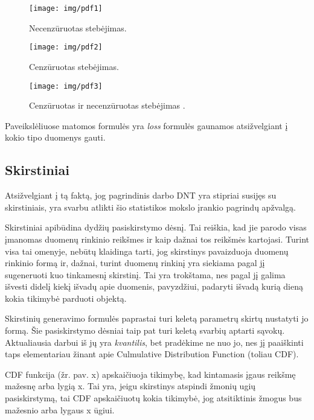 \documentclass{VUMIFPSkursinis}
\begin{document}
\begin{figure}[H]
  \centering
  \texttt{[image: img/pdf1]}
  \caption{ Necenzūruotas stebėjimas\cite{WTTEBLOG}.}
  \label{img:pdf1}
\end{figure}


\begin{figure}[H]
  \centering
  \texttt{[image: img/pdf2]}
  \caption{ Cenzūruotas stebėjimas\cite{WTTEBLOG}.}
  \label{img:pdf2}
\end{figure}


\begin{figure}[H]
  \centering
  \texttt{[image: img/pdf3]}
  \caption{ Cenzūruotas ir necenzūruotas stebėjimas \cite{WTTEBLOG}.}
  \label{img:pdf3}
\end{figure}

Paveikslėliuose matomos formulės yra \textit{loss} formulės gaunamos atsižvelgiant į kokio tipo duomenys gauti. 



\subsection{Skirstiniai}

Atsižvelgiant į tą faktą, jog pagrindinis darbo DNT yra stipriai susijęs su skirstiniais, yra svarbu atlikti šio statistikos mokslo įrankio pagrindų apžvalgą. 

Skirstiniai apibūdina dydžių pasiskirstymo dėsnį. Tai reiškia, kad jie parodo visas įmanomas duomenų rinkinio reikšmes ir kaip dažnai tos reikšmės kartojasi. Turint visa tai omenyje, nebūtų klaidinga tarti, jog skirstinys pavaizduoja duomenų rinkinio formą ir, dažnai, turint duomenų rinkinį yra siekiama pagal jį sugeneruoti kuo tinkamesnį skirstinį. Tai yra trokštama, nes pagal jį galima išvesti didelį kiekį išvadų apie duomenis, pavyzdžiui, padaryti išvadą kurią dieną kokia tikimybė parduoti objektą.

Skirstinių generavimo formulės paprastai turi keletą parametrų skirtų nustatyti jo formą. Šie pasiskirstymo dėsniai taip pat turi keletą svarbių aptarti sąvokų. Aktualiausia darbui iš jų yra \textit{kvantilis}, bet pradėkime ne nuo jo, nes jį paaiškinti taps elementariau žinant apie Culmulative Distribution Function (toliau CDF). 

CDF funkcija (žr. pav. x) apskaičiuoja tikimybę, kad kintamasis įgaus reikšmę mažesnę arba lygią x. Tai yra, jeigu skirstinys atspindi žmonių ugių pasiskirstymą, tai CDF apskaičiuotų kokia tikimybė, jog atsitiktinis žmogus bus mažesnio arba lygaus x ūgiui. 
\end{document}
